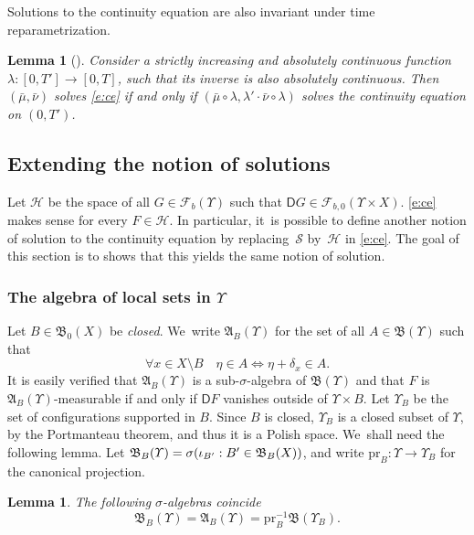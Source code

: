 \documentclass[10pt]{amsart}
\newtheorem{lemma}[theorem]{Lemma}
\theoremstyle{definition}
\theoremstyle{remark}
\DeclarePairedDelimiter{\paren}{\lparen}{\rparen}
\begin{document}
Solutions to the continuity equation are also invariant under time reparametrization.
\begin{lemma}[{\cite[Lem.\,8.1.3]{AGS}}]\label{t:ce-time-reparametrization}
Consider a strictly increasing and absolutely continuous function $\lambda \colon [0,T'] \to [0,T]$, such that its inverse is also absolutely continuous.
Then $(\bar{\mu}, \bar{\nu})$ solves \cref{e:ce} if and only if $(\bar{\mu} \circ \lambda, \lambda' \cdot \bar{\nu} \circ \lambda)$ solves the continuity equation on $(0,T')$.
\end{lemma}

\subsection{Extending the notion of solutions}
Let $\mathscr{H}$ be the space of all $G \in \mathscr{F}_{b}(\varUpsilon)$ such that $\mathsf{D} G \in \mathscr{F}_{b,0}(\varUpsilon \times X)$.
\cref{e:ce} makes sense for every $F \in \mathscr{H}$.
In particular, it~is possible to define another notion of solution to the continuity equation by replacing~$\mathscr{S}$ by~$\mathscr{H}$ in \cref{e:ce}.
The goal of this section is to shows that this yields the same notion of solution.

\subsubsection{The algebra of local sets \texorpdfstring{in $\varUpsilon$}{on the space of configurations}}\label{s:local-algebra}
Let $B \in \mathfrak{B}_{0}(X)$ be \emph{closed}. We~write $\mathfrak{A}_{B}(\varUpsilon)$ for the set of all $A \in \mathfrak{B}(\varUpsilon)$ such that
\begin{equation*}
\forall x \in X \setminus B \quad \eta \in A \iff \eta + \delta_{x} \in A .
\end{equation*}
It is easily verified that $\mathfrak{A}_{B}(\varUpsilon)$ is a sub-$\sigma$-algebra of $\mathfrak{B}(\varUpsilon)$ and that $F$ is $\mathfrak{A}_{B}(\varUpsilon)$-measurable if and only if $\mathsf{D} F$ vanishes outside of $\varUpsilon \times B$.
Let $\varUpsilon_{B}$ be the set of configurations supported in $B$.
Since $B$ is closed, $\varUpsilon_{B}$ is a closed subset of $\varUpsilon$, by the Portmanteau theorem, and thus it is a Polish space. We~shall need the following lemma.
Let $\mathfrak{B}_{B}(\varUpsilon) = \sigma\paren*{\iota_{B'} : B' \in \mathfrak{B}_{B}(X)} $, and write $\mathrm{pr}_{B} \colon \varUpsilon \to \varUpsilon_{B}$ for the canonical projection.
\begin{lemma}\label{t:local-sigma-algebra}
The following $\sigma$-algebras coincide
\begin{equation*}
\mathfrak{B}_{B}(\varUpsilon) = \mathfrak{A}_{B}(\varUpsilon) = \mathrm{pr}_{B}^{-1} \mathfrak{B}(\varUpsilon_{B}).
\end{equation*}
\end{lemma}
\end{document}
